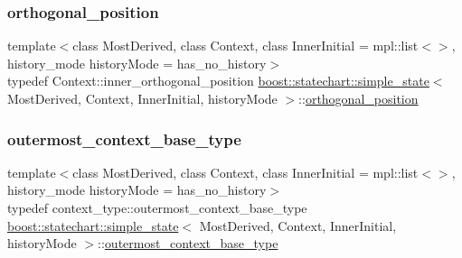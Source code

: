 \subsubsection{\texorpdfstring{orthogonal\+\_\+position}{orthogonal\_position}}
{\footnotesize\ttfamily template$<$class Most\+Derived, class Context, class Inner\+Initial = mpl\+::list$<$$>$, history\+\_\+mode history\+Mode = has\+\_\+no\+\_\+history$>$ \\
typedef Context\+::inner\+\_\+orthogonal\+\_\+position \mbox{\hyperlink{classboost_1_1statechart_1_1simple__state}{boost\+::statechart\+::simple\+\_\+state}}$<$ Most\+Derived, Context, Inner\+Initial, history\+Mode $>$\+::\mbox{\hyperlink{classboost_1_1statechart_1_1simple__state_af97b00e4ff6f12a1045beb57687cf9bc}{orthogonal\+\_\+position}}}

\mbox{\label{classboost_1_1statechart_1_1simple__state_a50f21d7a7d6632eb34430e74cbad3197}} 
\subsubsection{\texorpdfstring{outermost\+\_\+context\+\_\+base\+\_\+type}{outermost\_context\_base\_type}}
{\footnotesize\ttfamily template$<$class Most\+Derived, class Context, class Inner\+Initial = mpl\+::list$<$$>$, history\+\_\+mode history\+Mode = has\+\_\+no\+\_\+history$>$ \\
typedef context\+\_\+type\+::outermost\+\_\+context\+\_\+base\+\_\+type \mbox{\hyperlink{classboost_1_1statechart_1_1simple__state}{boost\+::statechart\+::simple\+\_\+state}}$<$ Most\+Derived, Context, Inner\+Initial, history\+Mode $>$\+::\mbox{\hyperlink{classboost_1_1statechart_1_1simple__state_a50f21d7a7d6632eb34430e74cbad3197}{outermost\+\_\+context\+\_\+base\+\_\+type}}}

\mbox{\label{classboost_1_1statechart_1_1simple__state_a25f32527ab9e99c9ae75c723e4be9cb6}} 
